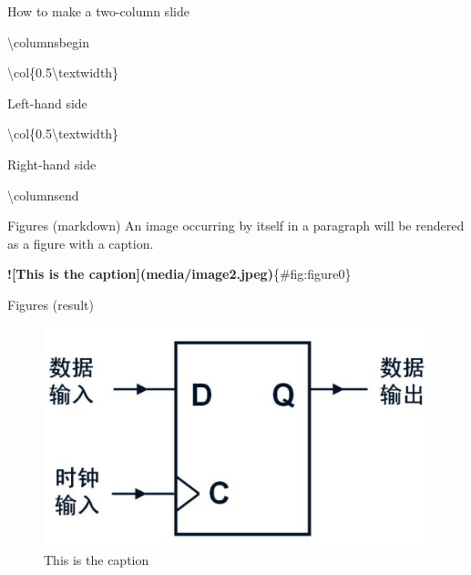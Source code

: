 \documentclass[
  10pt,
  ignorenonframetext,
  serif,onlymath]{beamer}
\newenvironment{Shaded}{}{}
\newcommand{\AlertTok}[1]{\textcolor[rgb]{1.00,0.00,0.00}{\textbf{#1}}}
\newcommand{\NormalTok}[1]{#1}
\begin{document}
\begin{frame}[fragile]{How to make a two-column slide}
\protect\hypertarget{how-to-make-a-two-column-slide}{}
\begin{Shaded}
\begin{Highlighting}[]
\NormalTok{\textbackslash{}columnsbegin}

\NormalTok{\textbackslash{}col\{0.5\textbackslash{}textwidth\}}

\NormalTok{  Left{-}hand side}

\NormalTok{\textbackslash{}col\{0.5\textbackslash{}textwidth\}}

\NormalTok{  Right{-}hand side}

\NormalTok{\textbackslash{}columnsend}
\end{Highlighting}
\end{Shaded}
\end{frame}

\begin{frame}[fragile]{Figures (markdown)}
\protect\hypertarget{figures-markdown}{}
An image occurring by itself in a paragraph will be rendered as a figure
with a caption.

\begin{Shaded}
\begin{Highlighting}[]
\AlertTok{![This is the caption](media/image2.jpeg)}\NormalTok{\{\#fig:figure0\}}
\end{Highlighting}
\end{Shaded}
\end{frame}

\begin{frame}{Figures (result)}
\protect\hypertarget{figures-result}{}
\begin{figure}
\hypertarget{fig:figure0}{%
\centering
\includegraphics{media/image2.jpeg}
\caption{This is the caption}\label{fig:figure0}
}
\end{figure}
\end{frame}
\end{document}
